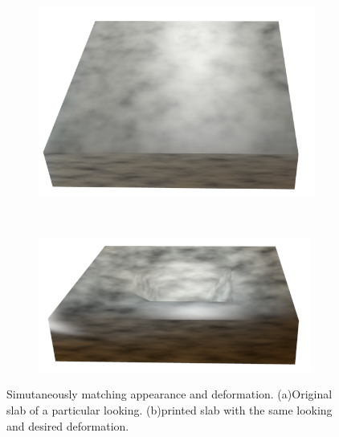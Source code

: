 \documentclass[annual]{acmsiggraph}
\begin{document}
\begin{figure}
\begin{subfigure}[b]{0.3\textwidth}
	\centering
 	\includegraphics[width=\textwidth]{figure/slab_origin.png}
   	\caption{}
    \label{fig:deformPhoto}
    \end{subfigure}
    ~ 
    \begin{subfigure}[b]{0.3\textwidth}
    \centering
  	\includegraphics[width=\textwidth]{figure/slab_deform.png}
    \caption{}
    \label{fig:deformPrint}
\end{subfigure}
\caption{Simutaneously matching appearance and deformation. 
(a)Original slab of a particular looking. (b)printed slab 
with the same looking and desired deformation.}
\label{fig:deform}
\end{figure}
\end{document}
